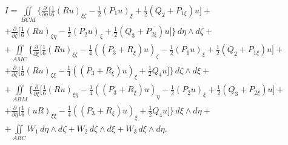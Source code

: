 \begin{gather*}


I=\iint\limits_{BCM} \bigg\{


\frac{\partial }{\partial \eta} \bigg[ \frac{1}{6}


(Ru)_{\xi\zeta}-\frac{1}{2} (P_1 u)_\xi +\frac{1}{2} (Q_2+P_{1\xi})u\bigg]+\\


%


+\frac{\partial }{\partial \zeta} \bigg[


\frac{1}{6} (Ru)_{\xi\eta}-\frac{1}{2} (P_2 u)_\xi


+\frac{1}{2} (Q_3+P_{2\xi})u \bigg] \bigg \}\, d\eta\wedge d\zeta + \\


%


+\iint\limits_{AMC} \bigg\{


\frac{\partial }{\partial \xi} \bigg[ \frac{1}{6}


(Ru)_{\xi\zeta}-\frac{1}{4} ((P_3 +R_\xi)u)_\zeta -\frac{1}{2} (P_1 u)_\xi


+\frac{1}{2} (Q_2+P_{1\xi})u \bigg]+ \\


%


+\frac{\partial }{\partial \zeta} \bigg[ \frac{1}{6}


(Ru)_{\xi\xi}-\frac{1}{4} ((P_3 +R_\xi)u)_\xi +\frac{1}{2} Q_4 u


\bigg] \bigg\} \, d\zeta\wedge  d\xi + \\


%


+\iint\limits_{ABM} \bigg \{ \frac{\partial }{\partial \xi} \bigg[


\frac{1}{6} (Ru)_{\xi\eta}-\frac{1}{4}


((P_3 +R_\xi)u)_\eta -\frac{1}{2} (P_2 u)_\xi


+\frac{1}{2} (Q_3 +P_{2\xi})u\bigg] + \\


%


+\frac{\partial }{\partial \eta} \bigg[


\frac{1}{6} (uR)_{\xi\xi} -\frac{1}{4} ((P_3 +R_\xi)u)_\xi +\frac{1}{2} Q_4 u


\bigg] \bigg\} \, d\xi\wedge d\eta + \\


%


+\iint\limits_{ABC} W_1\, d\eta\wedge d\zeta


+W_2\, d\zeta \wedge d\xi + W_3\, d\xi \wedge d\eta.


\end{gather*}





